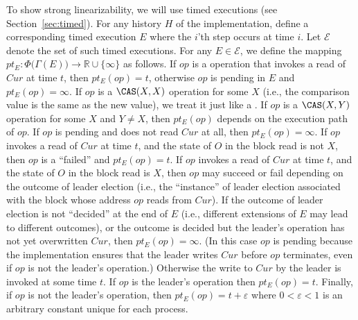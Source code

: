 \documentclass[11pt,letterpaper]{article}
\newcommand{\eps}{\varepsilon}
\renewcommand{\O}{\ensuremath{{O}}}
\newcommand{\EE}{\mathcal{E}}
\newcommand{\op}{\ensuremath{\mathit{op}}}
\begin{document}
To show strong linearizability, we will use timed executions (see Section~\ref{sec:timed}).
For any history $H$ of the implementation, define a corresponding timed execution $E$
  where the $i$'th step occurs at time $i$.
Let $\EE$ denote the set of such timed executions.
For any $E \in \EE$, we define the mapping $pt_E:\Phi\bigl(\Gamma(E)\bigr)\rightarrow\mathds{R}\cup\{\infty\}$
  as follows.
If $\op$ is a \Read operation that invokes a read of $Cur$ at time $t$, then $pt_E(\op) = t$, otherwise
   $\op$ is pending in $E$ and $pt_E(\op) = \infty$.
If $\op$ is a $\CAS(X, X)$ operation for some $X$ (i.e., the comparison value is the same as the new value),
  we treat it just like a \Read.
If $\op$ is a $\CAS(X, Y)$ operation for some $X$ and $Y \neq X$, then $pt_E(\op)$ depends on the execution
   path of $\op$.
If $\op$ is pending and does not read $Cur$ at all, then $pt_E(\op) = \infty$.
If $\op$ invokes a read of $Cur$ at time $t$, and the state of $\O$ in the block read is not $X$, then
   $\op$ is a ``failed'' \CAS and $pt_E(\op) = t$.
If $\op$ invokes a read of $Cur$ at time $t$, and the state of $\O$ in the block read is $X$, then
   $\op$ may succeed or fail depending on the outcome of leader election
   (i.e., the ``instance'' of leader election associated with the block whose address $\op$ reads from $Cur$).
If the outcome of leader election is not ``decided'' at the end of $E$ (i.e., different extensions of $E$
   may lead to different outcomes), or the outcome is decided
   but the leader's operation has not yet overwritten $Cur$, then $pt_E(\op) = \infty$.
(In this case $\op$ is pending because the implementation ensures that the leader writes $Cur$
   before $\op$ terminates, even if $\op$ is not the leader's operation.)
Otherwise the write to $Cur$ by the leader is invoked at some time $t$.
If $\op$ is the leader's operation then $pt_E(\op) = t$.
Finally, if $\op$ is not the leader's operation, then $pt_E(\op) = t + \eps$ where
   $0 < \eps < 1$ is an arbitrary constant unique for each process.
\end{document}
